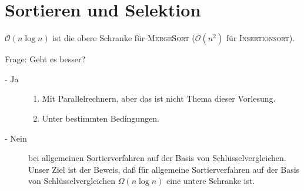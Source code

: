 \documentclass[ngerman,draft,parskip=half*,twoside]{scrreprt}
\theoremstyle{break}
\theoremstyle{nonumberbreak}
\newcommand*{\OO}{\mathcal{O}}      %
\begin{document}
%
\chapter{Sortieren und Selektion}

$\OO(n\log n)$ ist die obere Schranke für \textsc{MergeSort} ($\OO(n^2)$ für \textsc{Insertionsort}).

Frage: Geht es besser? 
\begin{description}
	\item[- Ja]
		\begin{enumerate}
			\item Mit Parallelrechnern, aber das ist nicht Thema dieser Vorlesung.
			\item Unter bestimmten Bedingungen.
		\end{enumerate}
	\item[- Nein]
		bei allgemeinen Sortierverfahren auf der Basis von Schlüsselvergleichen. Unser Ziel ist der Beweis, daß für  
		allgemeine Sortierverfahren auf der Basis von Schlüsselvergleichen $ \Omega(n\log n)$ eine untere Schranke ist.
\end{description} 
\end{document}
